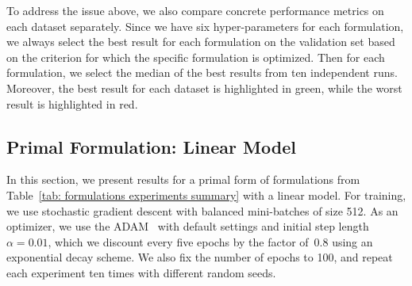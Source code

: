 To address the issue above, we also compare concrete performance metrics on each dataset separately. Since we have six hyper-parameters for each formulation, we always select the best result for each formulation on the validation set based on the criterion for which the specific formulation is optimized. Then for each formulation, we select the median of the best results from ten independent runs. Moreover, the best result for each dataset is highlighted in green, while the worst result is highlighted in red.


\subsection{Primal Formulation: Linear Model}\label{sec: results primal linear}

In this section, we present results for a primal form of formulations from Table~\ref{tab: formulations experiments summary} with a linear model. For training, we use stochastic gradient descent with balanced mini-batches of size 512. As an optimizer, we use the ADAM~\cite{kingma2014adam} with default settings and initial step length~$\alpha = 0.01$, which we discount every five epochs by the factor of~$0.8$ using an exponential decay scheme. We also fix the number of epochs to 100, and repeat each experiment ten times with different random seeds.

